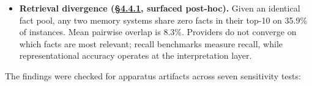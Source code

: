 \begin{itemize}
  / \hyperref[case-study-cross-system-refusal-on-keckley-q21]{§4.4.4}: the matched Behavioral Specification supplies the
  interpretive scaffolding the model needs to clear its implicit bar for
  committing to a prediction; without that scaffolding, the model hedges
  or abstains. The reduction is content-specific, not structure-specific
  (wrong-Spec preserves baseline refusal patterns).
\item
  \textbf{Retrieval divergence (\hyperref[cross-system-retrieval-providers-do-not-converge]{§4.4.1}, surfaced post-hoc).} Given an
  identical fact pool, any two memory systems share zero facts in their
  top-10 on 35.9\% of instances. Mean pairwise overlap is 8.3\%.
  Providers do not converge on which facts are most relevant; recall
  benchmarks measure recall, while representational accuracy operates at
  the interpretation layer.
\end{itemize}

The findings were checked for apparatus artifacts across seven
sensitivity tests:

